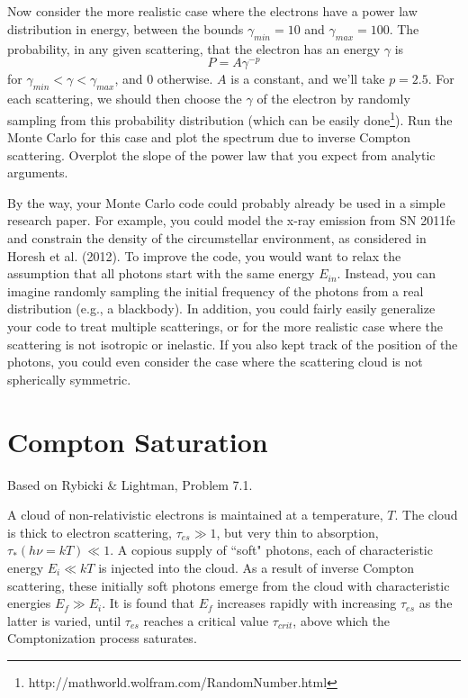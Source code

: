 \documentclass[11pt]{article}
\begin{document}
\subsection{}
Now consider the more realistic case where the electrons have a power law distribution in energy, between the bounds
$\gamma_{min}=10$ and $\gamma_{max}=100$.  The probability, in any given scattering, that the
electron has an energy $\gamma$ is
\begin{equation}
P=A\gamma^{-p}
\end{equation}
for $\gamma_{min}<\gamma<\gamma_{max}$, and 0 otherwise.  $A$ is a constant, and we'll take
$p=2.5$.  For each scattering, we should then choose the $\gamma$ of the electron 
by randomly sampling from this probability distribution (which can be easily
done\footnote{http://mathworld.wolfram.com/RandomNumber.html}). Run 
the Monte Carlo for this case and plot the spectrum due to inverse
Compton scattering. 
Overplot the slope of the power law that you expect from analytic
arguments.

By the way, your Monte Carlo code could probably already be used in a simple
research paper. For example, you could model the x-ray emission from SN 2011fe
and constrain the density of the circumstellar environment, as considered in
Horesh et al. (2012). To improve the code, you would want to relax the
assumption that all photons start with the same energy $E_{in}$. Instead, you can
imagine randomly sampling the initial frequency of the photons from a real
distribution (e.g., a blackbody). In addition, you could fairly easily
generalize your code to treat multiple scatterings, or for the more realistic
case where the scattering is not isotropic or inelastic. If you also kept track
of the position of the photons, you could even consider the case where the
scattering cloud is not spherically symmetric.

\section{Compton Saturation}

Based on Rybicki \& Lightman, Problem 7.1.

A cloud of non-relativistic electrons is maintained at a temperature, $T$.  The cloud is thick to electron
scattering, $\tau_{es}\gg1$, but very thin to absorption, $\tau_*(h\nu=kT)\ll1$.  A copious
supply of ``soft" photons, each of characteristic energy $E_i\ll kT$ is injected into the cloud.
As a result of inverse Compton scattering, these initially soft photons emerge from the cloud 
with characteristic energies $E_f\gg E_i$.  It is found that $E_f$ increases rapidly with
increasing $\tau_{es}$ as the latter is varied, until $\tau_{es}$ reaches a critical value
$\tau_{crit}$, above which the Comptonization process saturates.
\end{document}
